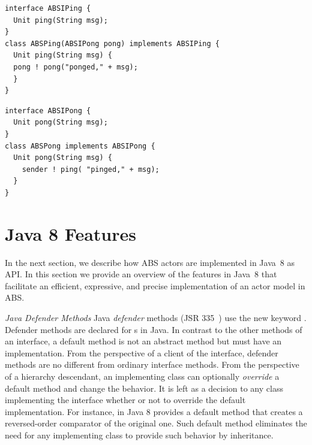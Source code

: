 \lstset{language=abs}
\begin{center}
\begin{minipage}[t]{0.48\textwidth}
\begin{lstlisting}[caption=Ping in ABS,label=lst:ping:abs]
interface ABSIPing {
  Unit ping(String msg);
}
class ABSPing(ABSIPong pong) implements ABSIPing {
  Unit ping(String msg) {
  pong ! pong("ponged," + msg);
  }
}
\end{lstlisting}
\end{minipage}
\hfill
\begin{minipage}[t]{0.48\textwidth}
\begin{lstlisting}[caption=Pong in ABS,label=lst:pong:abs]
interface ABSIPong {
  Unit pong(String msg);
}
class ABSPong implements ABSIPong {
  Unit pong(String msg) {
    sender ! ping( "pinged," + msg);
  }
}
\end{lstlisting}
\end{minipage}
\end{center}
\lstset{language=Java}

\section{Java 8 Features}
\label{sec:j8:features}

In the next section, we describe how ABS actors are implemented in Java~8 as API.
In this section we provide an overview of the features in Java~8 that facilitate an efficient, expressive, and precise implementation of an actor model
in ABS.

\textsl{Java Defender Methods}
Java \emph{defender} methods (JSR 335~\cite{jsr335}) use the new keyword . 
Defender methods are declared for s in Java. 
In contrast to the other methods of an interface, a default method is not an abstract method but  must have an implementation.
From the perspective of a client of the interface, defender methods are no different from ordinary interface methods.
From the perspective of a hierarchy descendant, an implementing class can optionally \textit{override} a default method and change the behavior.
It is left as a decision to any class implementing the interface whether or not to override the default implementation.
For instance, in Java 8  provides a default method  that creates a reversed-order comparator of the original one.
Such default method eliminates the need for any implementing class to provide such behavior by inheritance.

